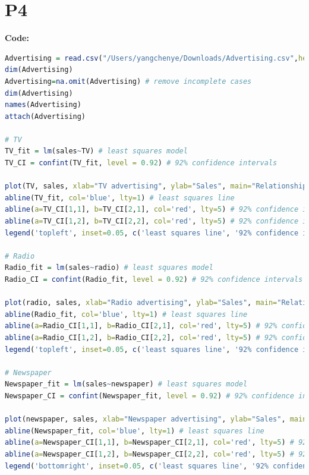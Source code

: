 \documentclass[twoside]{homework}
\begin{document}
\section*{P4}
\textbf{Code:}
\begin{lstlisting}[language=R]
Advertising = read.csv("/Users/yangchenye/Downloads/Advertising.csv",header=T,na.strings="?") 
dim(Advertising)
Advertising=na.omit(Advertising) # remove incomplete cases
dim(Advertising)
names(Advertising)
attach(Advertising)

# TV
TV_fit = lm(sales~TV) # least squares model
TV_CI = confint(TV_fit, level = 0.92) # 92% confidence intervals

plot(TV, sales, xlab="TV advertising", ylab="Sales", main="Relationship between Sales and TV advertising") # scatterplot
abline(TV_fit, col='blue', lty=1) # least squares line
abline(a=TV_CI[1,1], b=TV_CI[2,1], col='red', lty=5) # 92% confidence intervals line
abline(a=TV_CI[1,2], b=TV_CI[2,2], col='red', lty=5) # 92% confidence intervals line
legend('topleft', inset=0.05, c('least squares line', '92% confidence intervals line'), lty=c(1, 5), col=c('blue', 'red'), bty = "o")

# Radio
Radio_fit = lm(sales~radio) # least squares model
Radio_CI = confint(Radio_fit, level = 0.92) # 92% confidence intervals

plot(radio, sales, xlab="Radio advertising", ylab="Sales", main="Relationship between Sales and Radio advertising") # scatterplot
abline(Radio_fit, col='blue', lty=1) # least squares line
abline(a=Radio_CI[1,1], b=Radio_CI[2,1], col='red', lty=5) # 92% confidence intervals line
abline(a=Radio_CI[1,2], b=Radio_CI[2,2], col='red', lty=5) # 92% confidence intervals line
legend('topleft', inset=0.05, c('least squares line', '92% confidence intervals line'), lty=c(1, 5), col=c('blue', 'red'), bty = "o")

# Newspaper
Newspaper_fit = lm(sales~newspaper) # least squares model
Newspaper_CI = confint(Newspaper_fit, level = 0.92) # 92% confidence intervals

plot(newspaper, sales, xlab="Newspaper advertising", ylab="Sales", main="Relationship between Sales and Newspaper advertising") # scatterplot
abline(Newspaper_fit, col='blue', lty=1) # least squares line
abline(a=Newspaper_CI[1,1], b=Newspaper_CI[2,1], col='red', lty=5) # 92% confidence intervals line
abline(a=Newspaper_CI[1,2], b=Newspaper_CI[2,2], col='red', lty=5) # 92% confidence intervals line
legend('bottomright', inset=0.05, c('least squares line', '92% confidence intervals line'), lty=c(1, 5), col=c('blue', 'red'), bty = "o")
\end{lstlisting}
\end{document}
